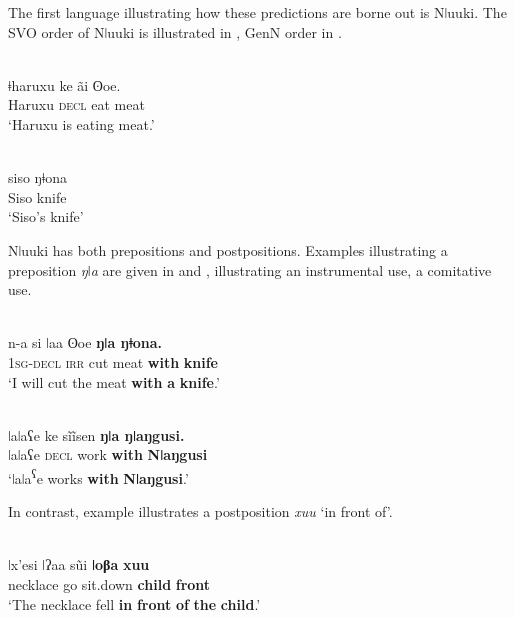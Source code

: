 \documentclass[output=paper]{langsci/langscibook}
\begin{document}
The first language illustrating how these predictions are borne out is Nǀuuki. The SVO order of Nǀuuki is illustrated in , GenN order in .

\ea\label{ex:dryer:11}
\\
\gll ǂharuxu    ke  ãi  ʘoe.\\
       Haruxu  \textsc{decl}  eat  meat \\
\glt ‘Haruxu is eating meat.’  
\z

\ea\label{ex:dryer:12}
\\
\gll siso  ŋǂona\\
       Siso  knife\\
\glt   ‘Siso’s knife’
\z

Nǀuuki has both prepositions and postpositions. Examples illustrating a preposition \textit{ŋǀa} are given in  and ,  illustrating an instrumental use,  a comitative use.

\ea\label{ex:dryer:13}
\\
\gll n-a  si  ǀaa  ʘoe  \textbf{ŋǀa  ŋǂona.}\\
       \textsc{1sg-decl}  \textsc{irr}  cut  meat  \textbf{with}  \textbf{knife}  \\
\glt ‘I will cut the meat \textbf{with} \textbf{a} \textbf{knife}.’  
\z

\ea\label{ex:dryer:14}
\\
\gll ǀaǀaʕe  ke  sĩĩsen  \textbf{ŋǀa  ŋǀaŋgusi.}\\
       ǀaǀaʕe  \textsc{decl}  work  \textbf{with}  \textbf{Nǀaŋgusi}  \\
\glt ‘ǀaǀa\textsuperscript{ʕ}e works \textbf{with} \textbf{Nǀaŋgusi}.’  
\z

In contrast, example  illustrates a postposition \textit{xuu} ‘in front of’.

\ea\label{ex:dryer:15}
\\
\gll ǀx’esi  ǀʔaa  s\~ui  \textbf{ǀoβa}  \textbf{xuu}\\
       necklace  go  sit.down  \textbf{child}  \textbf{front}  \\
\glt ‘The necklace fell \textbf{in} \textbf{front} \textbf{of} \textbf{the} \textbf{child}.’ 
\z
\end{document}
